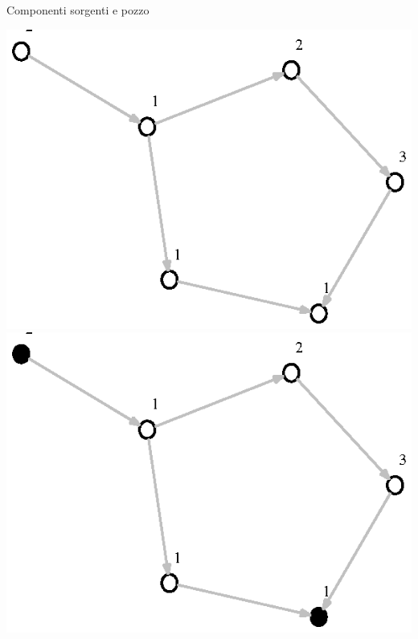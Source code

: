 \documentclass{beamer}
\begin{document}
\begin{frame}{Componenti sorgenti e pozzo}
\begin{center} 
  \includegraphics[scale=.6]{images/presentation-scc-metagraph-all-whites.eps}
  \includegraphics[scale=.6]{images/presentation-scc-metagraph-with-b.eps}
\end{center}
\end{frame}
\end{document}
